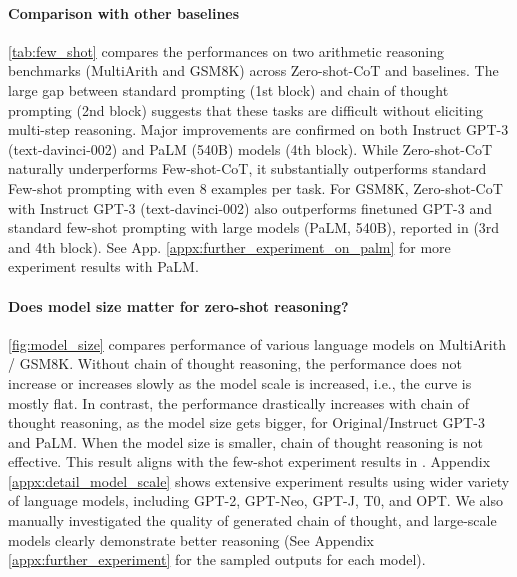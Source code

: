 \documentclass{article}
\newcommand{\CoT}{chain of thought\xspace}
\newcommand{\ours}{Zero-shot-CoT\xspace}
\newcommand{\theirs}{Few-shot-CoT\xspace}
\newcommand{\theirsf}{Few-shot\xspace}
\begin{document}
%


%

\paragraph{Comparison with other baselines}

\autoref{tab:few_shot} compares the performances on two arithmetic reasoning benchmarks (MultiArith and GSM8K) across \ours and baselines. 
The large gap between standard prompting (1st block) and chain of thought prompting (2nd block) suggests that these tasks are difficult without eliciting multi-step reasoning. 
Major improvements are confirmed on both Instruct GPT-3 (text-davinci-002) and PaLM (540B) models (4th block). 
While \ours naturally underperforms \theirs, it substantially outperforms standard \theirsf prompting with even 8 examples per task. 
For GSM8K, \ours with Instruct GPT-3 (text-davinci-002) also outperforms finetuned GPT-3 and standard few-shot prompting with large models (PaLM, 540B), reported in \citet{cot_wei} (3rd and 4th block). 
See App. \ref{appx:further_experiment_on_palm} for more experiment results with PaLM.

\paragraph{Does model size matter for zero-shot reasoning?}

\autoref{fig:model_size} compares performance of various language models on MultiArith / GSM8K. 
Without \CoT reasoning, the performance does not increase or increases slowly as the model scale is increased, i.e., the curve is mostly flat. 
In contrast, the performance drastically increases with \CoT reasoning, as the model size gets bigger, for Original/Instruct GPT-3 and PaLM. %
When the model size is smaller, \CoT reasoning is not effective. 
This result aligns with the few-shot experiment results in \cite{cot_wei}.
Appendix \ref{appx:detail_model_scale} shows extensive experiment results using wider variety of language models, including GPT-2, GPT-Neo, GPT-J, T0, and OPT.
We also manually investigated the quality of generated \CoT, and large-scale models clearly demonstrate better reasoning (See Appendix \ref{appx:further_experiment} for the sampled outputs for each model).
\end{document}
